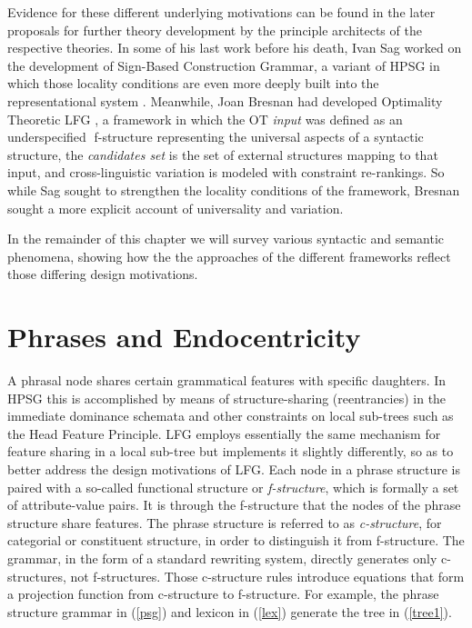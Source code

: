 Evidence for these different underlying motivations can be found in the later proposals for further theory development by the principle architects of the respective theories.  In some of his last work before his death, Ivan Sag worked on the development of Sign-Based Construction Grammar, a variant of HPSG in which those locality conditions are even more deeply built into the representational system \citep{BS2012a-ed}.  Meanwhile, Joan Bresnan had developed Optimality Theoretic LFG \citep{Bresnan97e}, a framework in which the OT \textit{input} was defined as an underspecified􏲇 f-structure representing the universal aspects of a syntactic structure, the \textit{candidates set} is the set of external structures mapping to that input, and cross-linguistic variation is modeled with constraint re-rankings.  So while Sag sought to strengthen the locality conditions of the framework, Bresnan sought a more explicit account of universality and variation.  

In the remainder of this chapter we will survey various syntactic and semantic phenomena, showing how the the approaches of the different frameworks reflect those differing design motivations.  

\section{Phrases and Endocentricity} 
A phrasal node shares certain grammatical features with specific daughters. %
In HPSG this is accomplished
by means of structure-sharing (reentrancies) in the immediate dominance schemata and other 
constraints on local sub-trees such as the Head Feature Principle.  LFG employs essentially the same mechanism for feature sharing in a local sub-tree but implements it slightly differently, so as to better address the design motivations of LFG.  Each node in a phrase structure is paired with a so-called functional structure or \textit{f-structure}, which is formally a set of attribute-value pairs.  It is through the f-structure that the nodes of the phrase structure share features.   The phrase structure is referred to as \textit{c-structure}, for categorial or constituent structure, in order to distinguish it from f-structure.  The grammar, in the form of a standard rewriting system, directly generates only c-structures, not f-structures.   Those c-structure rules introduce equations that form a projection function from c-structure to f-structure.  For example, the phrase structure grammar in (\ref{psg}) and lexicon in (\ref{lex}) generate the tree in (\ref{tree1}).  

